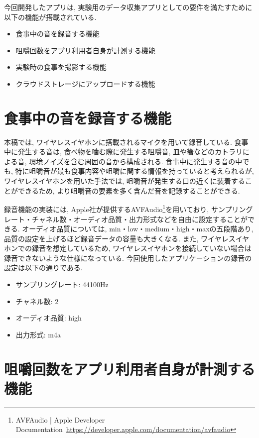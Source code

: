 今回開発したアプリは, 実験用のデータ収集アプリとしての要件を満たすために以下の機能が搭載されている.

\begin{itemize}
    \item 食事中の音を録音する機能
    \item 咀嚼回数をアプリ利用者自身が計測する機能
    \item 実験時の食事を撮影する機能
    \item クラウドストレージにアップロードする機能
\end{itemize}

\section{食事中の音を録音する機能}

本稿では, ワイヤレスイヤホンに搭載されるマイクを用いて録音している. 食事中に発生する音は, 食べ物を噛む際に発生する咀嚼音, 皿や箸などのカトラリによる音, 環境ノイズを含む周囲の音から構成される. 食事中に発生する音の中でも, 特に咀嚼音が最も食事内容や咀嚼に関する情報を持っていると考えられるが, ワイヤレスイヤホンを用いた手法では, 咀嚼音が発生する口の近くに装着することができるため, より咀嚼音の要素を多く含んだ音を記録することができる.

録音機能の実装には, Apple社が提供するAVFAudio\footnote{AVFAudio | Apple Developer Documentation~\url{https://developer.apple.com/documentation/avfaudio}}を用いており, サンプリングレート・チャネル数・オーディオ品質・出力形式などを自由に設定することができる. オーディオ品質については, min・low・medium・high・maxの五段階あり, 品質の設定を上げるほど録音データの容量も大きくなる. また, ワイヤレスイヤホンでの録音を想定しているため, ワイヤレスイヤホンを接続していない場合は録音できないような仕様になっている. 今回使用したアプリケーションの録音の設定は以下の通りである.

\begin{itemize}
    \item サンプリングレート: 44100Hz
    \item チャネル数: 2
    \item オーディオ品質: high
    \item 出力形式: m4a
\end{itemize}

\section{咀嚼回数をアプリ利用者自身が計測する機能}

